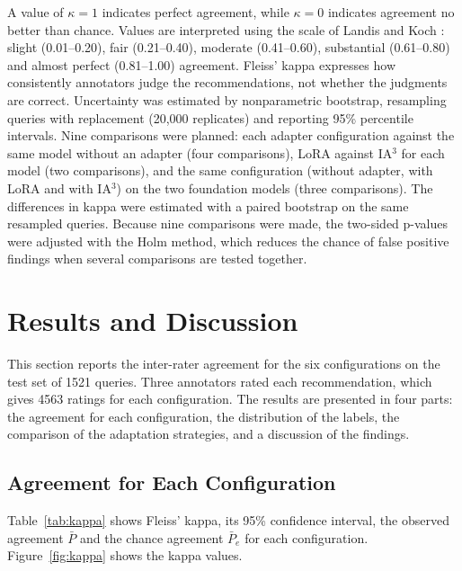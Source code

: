 \documentclass[journal,article,submit,pdftex,moreauthors]{Definitions/mdpi}
\begin{document}
A value of $\kappa = 1$ indicates perfect agreement, while $\kappa = 0$ indicates agreement no better than chance. Values are interpreted using the scale of Landis and Koch \citep{landis1977measurement}: slight (0.01--0.20), fair (0.21--0.40), moderate (0.41--0.60), substantial (0.61--0.80) and almost perfect (0.81--1.00) agreement. Fleiss' kappa expresses how consistently annotators judge the recommendations, not whether the judgments are correct. Uncertainty was estimated by nonparametric bootstrap, resampling queries with replacement (20,000 replicates) and reporting 95\% percentile intervals. Nine comparisons were planned: each adapter configuration against the same model without an adapter (four comparisons), LoRA against IA$^3$ for each model (two comparisons), and the same configuration (without adapter, with LoRA and with IA$^3$) on the two foundation models (three comparisons). The differences in kappa were estimated with a paired bootstrap on the same resampled queries. Because nine comparisons were made, the two-sided p-values were adjusted with the Holm method, which reduces the chance of false positive findings when several comparisons are tested together.

\section{Results and Discussion}\label{sec:results}

This section reports the inter-rater agreement for the six configurations on the test set of 1521 queries. Three annotators rated each recommendation, which gives 4563 ratings for each configuration. The results are presented in four parts: the agreement for each configuration, the distribution of the labels, the comparison of the adaptation strategies, and a discussion of the findings.

\subsection{Agreement for Each Configuration}
Table~\ref{tab:kappa} shows Fleiss' kappa, its 95\% confidence interval, the observed agreement $\bar{P}$ and the chance agreement $\bar{P}_e$ for each configuration. Figure~\ref{fig:kappa} shows the kappa values.
\end{document}

